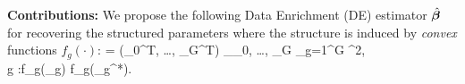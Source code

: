 

{\bf Contributions:}
We propose the following Data Enrichment (DE) estimator $\hat{\boldsymbol{\beta}}$ for recovering the structured parameters where the structure is induced by \emph{convex} functions $f_g(\cdot)$:
{\small\be
	\label{eq:super}
	\hbbe = (\hbbe_0^T, \dots, \hbbe_G^T) \in \argmin_{\bbeta _0, \dots, \bbeta _G}  \sum_{g=1}^{G} ^2,
	\\ \nr
	 \quad \forall g \in [G]:f_g(\bbeta _g) \leq f_g(\bbeta _g^*).
\ee}


